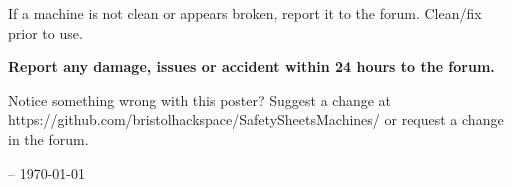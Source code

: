 {\begin{center}
	If a machine is not clean or appears broken, report it to the forum. Clean/fix prior to use.

	\textbf{Report any damage, issues or accident within 24 hours to the forum.}

        Notice something wrong with this poster? Suggest a change at https://github.com/bristolhackspace/SafetySheetsMachines/ or request a change in the forum.
\end{center}
\vfill
\begin{flushright}
{\tiny \version -- \today}
\end{flushright}
\pagebreak
}





